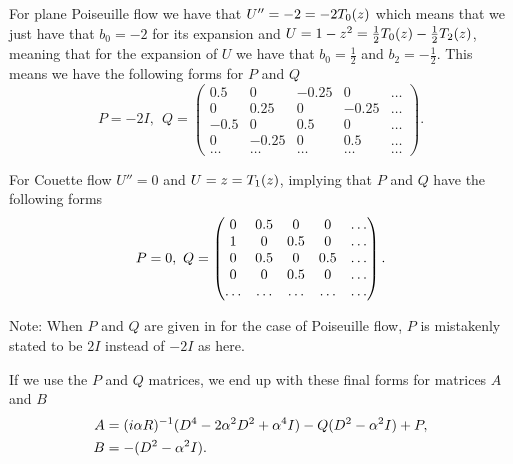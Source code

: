 

For plane Poiseuille flow we have that $ U'' = -2 = -2 T_{0}(z) $ which means that we just have that $ b_0 = -2 $ for its expansion and $ U = 1 - z^2 = \tfrac{1}{2} T_{0}(z) - \tfrac{1}{2} T_{2}(z) $, meaning that for the expansion of $ U $ we have that $ b_0 = \tfrac{1}{2}$ and $ b_2 = -\tfrac{1}{2} $. This means we have the following forms for $ P $ and $ Q $
\begin{equation}
    P = -2 I,\ \ Q = \begin{pmatrix}
        0.5 & 0 & -0.25 & 0 & \dots \\
        0 & 0.25 & 0 & -0.25 & \dots \\
        -0.5 & 0 & 0.5 & 0 & \dots \\
        0 & -0.25 & 0 & 0.5 & \dots \\
        \dots & \dots & \dots & \dots & \dots
    \end{pmatrix}.
\end{equation}

For Couette flow $ U'' = 0 $ and $U = z = T_{1}(z) $, implying that $P $ and $ Q $ have the following forms
\begin{equation}
    P = 0,\ Q = \begin{pmatrix}
        0 & 0.5 & 0 & 0 & \dots \\
        1 & 0 & 0.5 & 0 & \dots \\
        0 & 0.5 & 0 & 0.5 & \dots \\
        0 & 0 & 0.5 & 0 & \dots \\
        \dots & \dots & \dots & \dots & \dots
    \end{pmatrix}.
\end{equation}

Note: When $ P $ and $ Q $ are given in \cite{bukhari1997spectral} for the case of Poiseuille flow, $ P $ is mistakenly stated to be $ 2 I $ instead of $ -2 I$ as here. 

If we use the $ P $ and $ Q $ matrices, we end up with these final forms for matrices $ A $ and $B$
\begin{align}
    A &= (i \alpha R)^{-1} (D^4 - 2 \alpha^2 D^2 + \alpha^4 I) - Q (D^2 - \alpha^2 I) + P, \\
    B &= -(D^2 - \alpha^2 I).
    \label{4thblockform}
\end{align}

